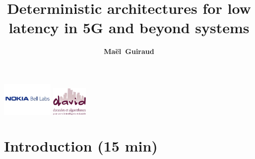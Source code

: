 \documentclass[10 pt]{beamer}
\title{ Deterministic architectures for low latency in 5G and beyond systems}
\author{{\bf Maël~Guiraud}}
\institute[Nokia Bell Labs, DAVID-UVSQ] 
{
  Nokia Bell Labs France - DAVID, Universit\'e de Versailles Saint Quentin
   \\
}
\begin{document}
\begin{frame}

  \titlepage
  \centering
  \includegraphics [width=25mm]{logon.png} \hspace{1cm} \includegraphics [width=17.5mm]{logod.png} \\
\end{frame}


\begin{frame}

\tableofcontents 
\end{frame}



\section{Introduction (15 min)}
\end{document}
